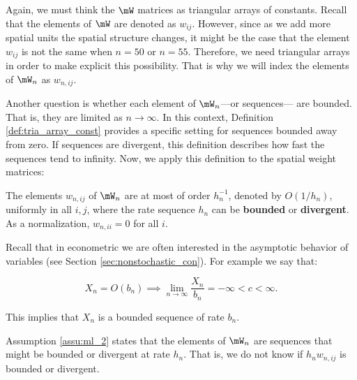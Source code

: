 \documentclass[english,12pt]{book}\usepackage[]{graphicx}\usepackage[]{xcolor}
\begin{document}
Again, we must think the $\mW$ matrices as triangular arrays of constants. Recall that the elements of $\mW$ are denoted as $w_{ij}$.  However, since as we add more spatial units the spatial structure changes, it might be the case that the element $w_{ij}$ is not the same when $n = 50$ or $n = 55$. Therefore, we need triangular arrays in order to make explicit this possibility. That is why we will index the elements of $\mW_n$ as $w_{n, ij}$.

Another question is whether each element of $\mW_n$---or sequences--- are bounded. That is, they are limited as $n\to \infty$. In this context, Definition \ref{def:tria_array_const} provides a specific setting for sequences bounded away from zero. If sequences are divergent, this definition describes how fast the sequences tend to infinity. Now, we apply this definition to the spatial weight matrices:

\begin{assumption}\label{assu:ml_2}
	The elements $w_{n,ij}$ of $\mW_n$ are at most of order $h_n^{-1}$, denoted by $O(1/h_n)$, uniformly in all $i,j$, where the rate sequence ${h_n}$ can be \textbf{bounded} or \textbf{divergent}. As a normalization, $w_{n,ii} = 0$ for all $i$.
\end{assumption}

Recall that in econometric we are often interested in the asymptotic behavior of variables (see Section \ref{sec:nonstochastic_con}). For example we say that:

\begin{equation*}
  X_n = O(b_n) \implies \lim_{n\to \infty}\frac{X_n}{b_n} = -\infty < c < \infty.
\end{equation*}

This implies that $X_n$ is a bounded sequence of rate $b_n$. %

%
Assumption \ref{assu:ml_2} states that the elements of $\mW_{n}$ are sequences that might be bounded or divergent at rate $h_n$. That is, we do not know if $h_nw_{n,ij}$ is bounded or divergent.
\end{document}
